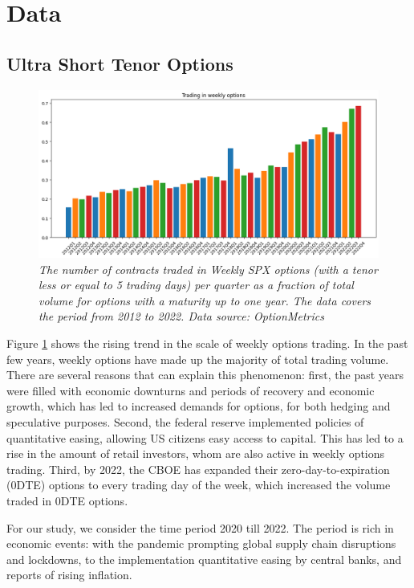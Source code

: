 \section{Data} \label{Data}

\subsection{Ultra Short Tenor Options} \label{3_ultra_short_tenor}

\begin{figure}
    \centering
    \includegraphics[width=\linewidth]{figures/option_volume.png}
    \caption{\textit{The number of contracts traded in Weekly SPX options (with a tenor less or equal to 5 trading days) per quarter as a fraction of total volume for options with a maturity up to one year. The data covers the period from 2012 to 2022. Data source: OptionMetrics}}
    \label{3_options_volume}
\end{figure}

Figure \ref{3_options_volume} shows the rising trend in the scale of weekly options trading. In the past few years, weekly options have made up the majority of total trading volume. There are several reasons that can explain this phenomenon: first, the past years were filled with economic downturns and periods of recovery and economic growth, which has led to increased demands for options, for both hedging and speculative purposes. Second, the federal reserve implemented policies of quantitative easing, allowing US citizens easy access to capital. This has led to a rise in the amount of retail investors, whom are also active in weekly options trading. Third, by 2022, the CBOE has expanded their zero-day-to-expiration (0DTE) options to every trading day of the week, which increased the volume traded in 0DTE options. 

For our study, we consider the time period 2020 till 2022. The period is rich in economic events: with the pandemic prompting global supply chain disruptions and lockdowns, to the implementation quantitative easing by central banks, and reports of rising inflation. 


